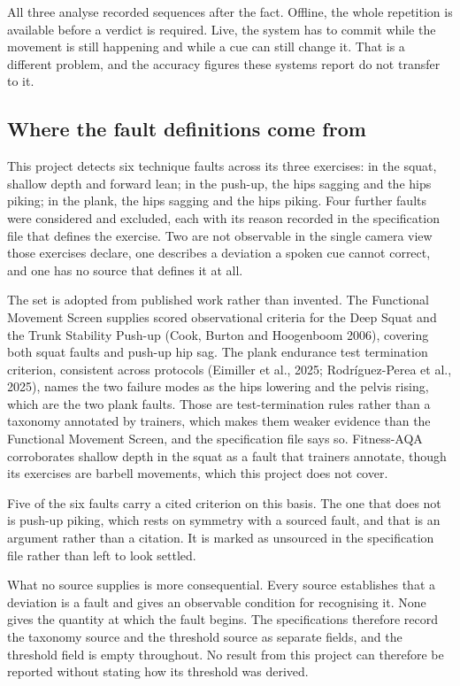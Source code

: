 All three analyse recorded sequences after the fact. Offline, the whole repetition is available before a verdict is required. Live, the system has to commit while the movement is still happening and while a cue can still change it. That is a different problem, and the accuracy figures these systems report do not transfer to it.

\subsection{Where the fault definitions come from}
\label{sec:2.3.3}

This project detects six technique faults across its three exercises: in the squat, shallow depth and forward lean; in the push-up, the hips sagging and the hips piking; in the plank, the hips sagging and the hips piking. Four further faults were considered and excluded, each with its reason recorded in the specification file that defines the exercise. Two are not observable in the single camera view those exercises declare, one describes a deviation a spoken cue cannot correct, and one has no source that defines it at all.

The set is adopted from published work rather than invented. The Functional Movement Screen supplies scored observational criteria for the Deep Squat and the Trunk Stability Push-up (Cook, Burton and Hoogenboom 2006)\cite{cook2006fms}, covering both squat faults and push-up hip sag. The plank endurance test termination criterion, consistent across protocols (Eimiller et al., 2025; Rodríguez-Perea et al., 2025)\cite{eimiller2025plank,rodriguezperea2025plank}, names the two failure modes as the hips lowering and the pelvis rising, which are the two plank faults. Those are test-termination rules rather than a taxonomy annotated by trainers, which makes them weaker evidence than the Functional Movement Screen, and the specification file says so. Fitness-AQA corroborates shallow depth in the squat as a fault that trainers annotate, though its exercises are barbell movements, which this project does not cover.

Five of the six faults carry a cited criterion on this basis. The one that does not is push-up piking, which rests on symmetry with a sourced fault, and that is an argument rather than a citation. It is marked as unsourced in the specification file rather than left to look settled.

What no source supplies is more consequential. Every source establishes that a deviation is a fault and gives an observable condition for recognising it. None gives the quantity at which the fault begins. The specifications therefore record the taxonomy source and the threshold source as separate fields, and the threshold field is empty throughout. No result from this project can therefore be reported without stating how its threshold was derived.


